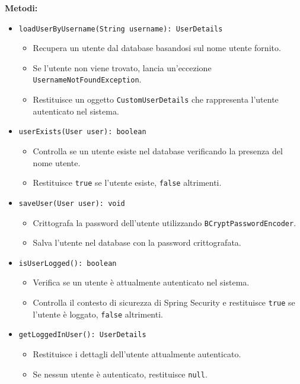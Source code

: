 \documentclass[twoside,openright,titlepage,fleqn,headinclude,12pt,a4paper,BCOR=5mm,footinclude]{scrbook}
\begin{document}
\textbf{Metodi:}  
\begin{itemize}  
    \item \texttt{loadUserByUsername(String username): UserDetails}  
    \begin{itemize}  
        \item Recupera un utente dal database basandosi sul nome utente fornito.  
        \item Se l'utente non viene trovato, lancia un'eccezione \texttt{UsernameNotFoundException}.  
        \item Restituisce un oggetto \texttt{CustomUserDetails} che rappresenta l'utente autenticato nel sistema.  
    \end{itemize}  

    \item \texttt{userExists(User user): boolean}  
    \begin{itemize}  
        \item Controlla se un utente esiste nel database verificando la presenza del nome utente.  
        \item Restituisce \texttt{true} se l'utente esiste, \texttt{false} altrimenti.  
    \end{itemize}  

    \item \texttt{saveUser(User user): void}  
    \begin{itemize}  
        \item Crittografa la password dell'utente utilizzando \texttt{BCryptPasswordEncoder}.  
        \item Salva l'utente nel database con la password crittografata.  
    \end{itemize}  

    \item \texttt{isUserLogged(): boolean}  
    \begin{itemize}  
        \item Verifica se un utente è attualmente autenticato nel sistema.  
        \item Controlla il contesto di sicurezza di Spring Security e restituisce \texttt{true} se l'utente è loggato, \texttt{false} altrimenti.  
    \end{itemize}  

    \item \texttt{getLoggedInUser(): UserDetails}  
    \begin{itemize}  
        \item Restituisce i dettagli dell'utente attualmente autenticato.  
        \item Se nessun utente è autenticato, restituisce \texttt{null}.  
    \end{itemize}  


\end{itemize}
\end{document}
